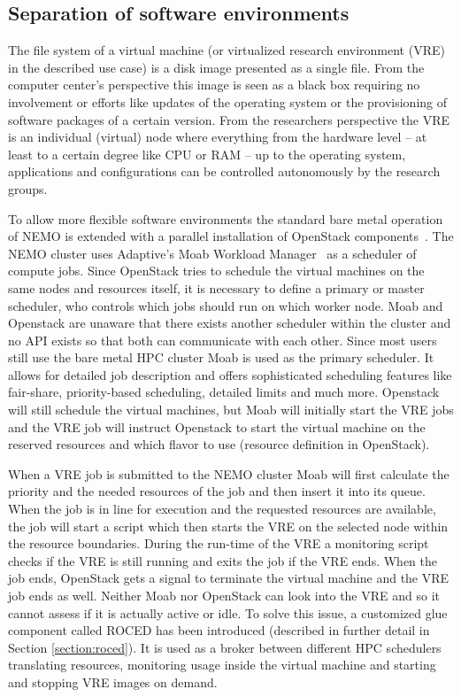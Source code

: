 \subsection{Separation of software environments}

The file system of a virtual machine (or virtualized research environment (VRE) in the described use case) is a
disk image presented as a single file. From the computer center's perspective
this image is seen as a black box requiring no involvement or efforts like
updates of the operating system or the provisioning of software packages of a
certain version. From the researchers perspective the VRE is an individual
(virtual) node where everything from the hardware level -- at least to a
certain degree like CPU or RAM -- up to the operating system,
applications and configurations can be controlled autonomously by the research groups.

To allow more flexible software environments the standard bare metal
operation of NEMO is extended with a parallel installation of OpenStack
components~\cite{hpc-symp:2016}.
The NEMO cluster uses Adaptive's Moab Workload Manager~\cite{Moab} as a
scheduler of compute jobs.
Since OpenStack tries to schedule the virtual machines on the same nodes and
resources itself, it is necessary to define a primary or master scheduler, who
controls which jobs should run on which worker node. Moab and Openstack are
unaware that there exists another scheduler within the cluster and no API exists
so that both can communicate with each other. Since most users still use the
bare metal HPC cluster Moab is used as the primary scheduler. It allows for
detailed job description and offers sophisticated scheduling features like
fair-share, priority-based scheduling, detailed limits and much more. Openstack
will still schedule the virtual machines, but Moab will initially start the VRE
jobs and the VRE job will instruct Openstack to start the virtual machine on the
reserved resources and which flavor to use (resource definition in OpenStack).

When a VRE job is submitted to the NEMO cluster Moab will first calculate the
priority and the needed resources of the job and then insert it into its queue.
When the job is in line for execution and the requested resources are available,
the job will start a script which then starts the VRE on the selected node
within the resource boundaries. During the run-time of the VRE a monitoring
script checks if the VRE is still running and exits the job if the VRE ends.
When the job ends, OpenStack gets a signal to terminate the virtual machine and
the VRE job ends as well.  Neither Moab nor OpenStack can look into the VRE and
so it cannot assess if it is actually active or idle. To solve this issue, a
customized glue component called ROCED has been introduced (described in
further detail in Section \ref{section:roced}).  It is used as a broker between
different HPC schedulers translating resources, monitoring usage inside the
virtual machine and starting and stopping VRE images on demand.
